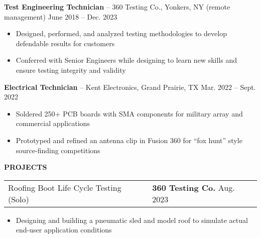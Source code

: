 \documentclass[18pt]{article}
\begin{document}
    \vspace{-0.5\baselineskip}
    \textbf{Test Engineering Technician} – 360 Testing Co., Yonkers, NY (remote management) \hfill June 2018 – Dec. 2023

    \begin{itemize}[noitemsep]
        \vspace{-0.75\baselineskip}
        \item Designed, performed, and analyzed testing methodologies to develop defendable results for customers
        \item Conferred with Senior Engineers while designing to learn new skills and ensure testing integrity and validity
    \end{itemize}

    \vspace{-0.5\baselineskip}
    \textbf{Electrical Technician} – Kent Electronics, Grand Prairie, TX \hfill Mar. 2022 – Sept. 2022

    \begin{itemize}[noitemsep]
        \vspace{-0.75\baselineskip}
        \item Soldered 250+ PCB boards with SMA components for military array and commercial applications
        \item Prototyped and refined an antenna clip in Fusion 360 for “fox hunt” style source-finding competitions 
    \end{itemize}



    \vspace{-1.25\baselineskip}
    \begin{center}
        \textbf{PROJECTS}
        \hrulefill
    \end{center}
    \vspace{-0.5\baselineskip}


    \begin{tabular}{p{} p{} }
        Roofing Boot Life Cycle Testing (Solo)
        &
        \textbf{360 Testing Co.}
        \hfill Aug. 2023
    \end{tabular}

    \vspace{-0.5\baselineskip}
    \begin{itemize}[noitemsep]
        \item Designing and building a pneumatic sled and model roof to simulate actual end-user application conditions 
    \end{itemize}
\end{document}
